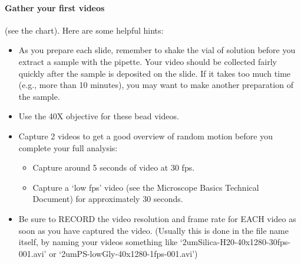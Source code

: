 \paragraph*{Gather your first videos} (see the chart). Here are some helpful hints:
\begin{itemize}
\item As you prepare each slide, remember to shake the vial of solution before you extract a sample with the pipette. Your video should be collected fairly quickly after the sample is deposited on the slide. If it takes too much time (e.g., more than 10 minutes), you may want to make another preparation of the sample.
\item Use the 40X objective for these bead videos.
\item Capture 2 videos to get a good overview of random motion before you complete your full analysis:
\begin{itemize}
	\item Capture around 5 seconds of video at 30 fps.
	\item Capture a `low fps' video (see the Microscope Basics Technical Document) for 			  approximately 30 seconds. 
\end{itemize}
\item Be sure to RECORD the video resolution and frame rate for EACH video as soon as you have captured the video. (Usually this is done in the file name itself, by naming your videos something like `2umSilica-H20-40x1280-30fps-001.avi' or `2umPS-lowGly-40x1280-1fps-001.avi')
\end{itemize}
